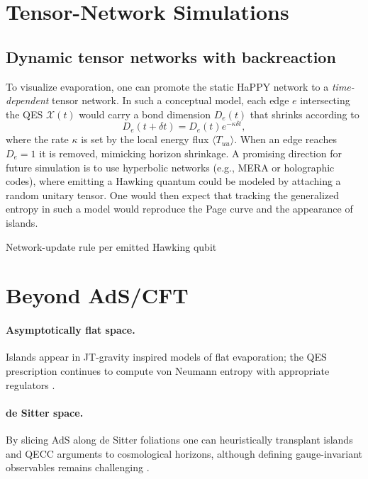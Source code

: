 \documentclass[12pt, numbers, sort&compress]{article}
\begin{document}
\section{Tensor-Network Simulations}
\subsection{Dynamic tensor networks with backreaction}
\label{subsec:dynamicTN}
To visualize evaporation, one can promote the static HaPPY network \cite{HaPPY:2015} to a \emph{time-dependent} tensor network. In such a conceptual model, each edge $e$ intersecting the QES $\mathcal{X}(t)$ would carry a bond dimension $D_e(t)$ that shrinks according to
\begin{equation}
D_e(t+\delta t) = D_e(t) e^{-\kappa \delta t},
\end{equation}
where the rate $\kappa$ is set by the local energy flux $\langle T_{uu}\rangle$. When an edge reaches $D_e=1$ it is removed, mimicking horizon shrinkage. A promising direction for future simulation is to use hyperbolic networks (e.g., MERA \cite{Vidal:2007MERA} or holographic codes), where emitting a Hawking quantum could be modeled by attaching a random unitary tensor. One would then expect that tracking the generalized entropy in such a model would reproduce the Page curve and the appearance of islands.


\begin{algorithm}[htbp]
\caption{Network-update rule per emitted Hawking qubit}
\end{algorithm}

\section{Beyond AdS/CFT}\label{sec:beyond}
\paragraph{Asymptotically flat space.}
Islands appear in JT-gravity inspired models of flat evaporation; the QES prescription continues to compute von Neumann entropy with appropriate regulators \cite{Gautason:2023flatIslands}.

\paragraph{de Sitter space.}
By slicing AdS along de Sitter foliations one can heuristically transplant islands and QECC arguments to cosmological horizons, although defining gauge-invariant observables remains challenging \cite{Akers:2023dSislands}.
\end{document}
